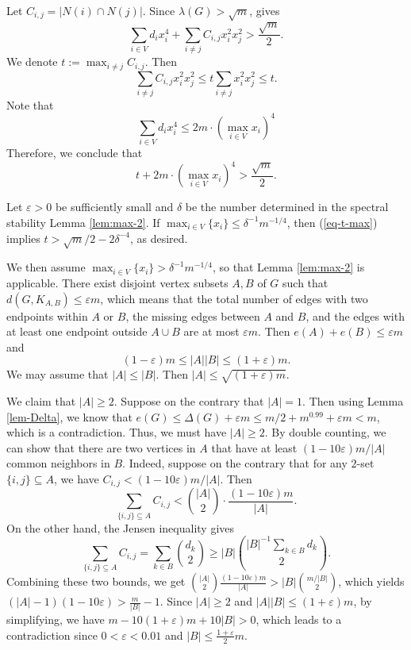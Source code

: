 \documentclass[11pt,a4paper]{article}
\theoremstyle{definition}
\theoremstyle{remark}
\begin{document}
Let $C_{i,j}=|N(i)\cap N(j)|$. Since $\lambda (G)> \sqrt{m}$,  gives 
    $$\sum_{i\in V} d_i x_i^4 + \sum_{i \neq j} C_{i, j} x_i^2 x_j^2 > \frac{\sqrt{m}}{2}.$$
    We denote $t := \max_{i \neq j} C_{i, j}$. Then 
    $$\sum_{i \neq j} C_{i, j} x_i^2 x_j^2 \leq t \sum_{i \neq j} x_i^2 x_j^2 \leq t.$$
    Note that 
    $$\sum_{i\in V} d_i x_i^4 \leq 2m \cdot (\max_{i\in V} x_i)^4$$
    Therefore, we conclude that 
    \begin{equation} \label{eq-t-max}
        t + 2m \cdot (\max_{i\in V} x_i)^4 > \frac{\sqrt{m}}{2}.
    \end{equation}
    
    Let $\varepsilon >0$ be sufficiently small and 
    $\delta $ be the number determined in 
    the spectral stability Lemma \ref{lem:max-2}. 
    If $\max_{i\in V} \{x_i\} \le \delta^{-1}m^{-1/4}$, 
    then (\ref{eq-t-max}) implies $t> \sqrt{m}/2 - 2\delta^{-4}$, as desired. 
    
    We then assume $\max_{i\in V} \{x_i\} > \delta^{-1} m^{-1/4} $, so that Lemma \ref{lem:max-2} is applicable. 
    There exist disjoint vertex subsets $A,B$ of $G$ such that 
    $d(G,K_{A,B})\le \varepsilon m$, which means that the total number of edges with two endpoints within $A$ or $B$, the missing edges between $A$ and $B$, and the edges with at least one endpoint outside $A\cup B$ are at most $\varepsilon m$. 
    Then $e(A)+e(B)\le \varepsilon m$ and 
    \[ (1- \varepsilon)m \le  |A||B|  \le (1+ \varepsilon )m. \]  
    We may assume that $|A|\le |B|$. 
    Then $|A| \le \sqrt{(1+\varepsilon)m}$. 

We claim that $ |A|\ge 2$. Suppose on the contrary that 
$|A|=1$. Then using Lemma \ref{lem-Delta}, we know that 
$ e(G)\le \Delta (G) + \varepsilon m \le m/2 + m^{0.99} + \varepsilon m <m$, which is a contradiction. 
 Thus, we must have $|A|\ge 2$. 
By double counting, we can show that 
    there are two vertices in $A$ that have at least ${(1- 10\varepsilon)m}/{|A|}$ common neighbors in $B$. 
Indeed, suppose on the contrary that 
for any $2$-set $\{i,j\} \subseteq A$, we have $C_{i,j}< {(1-10\varepsilon)m}/{|A|}$. Then 
\[ \sum_{\{i,j\} \subseteq A} C_{i,j} < {|A| \choose 2} \cdot \frac{(1-10\varepsilon)m}{|A|} .\]
On the other hand, the Jensen inequality gives  
\[ \sum_{\{i,j\}\subseteq A} C_{i,j} = \sum_{k\in B} {d_k \choose 2} \ge |B| {|B|^{-1} \sum_{k\in B}d_k \choose 2} .  \]
Combining these two bounds, we get 
${|A| \choose 2} \frac{(1-10\varepsilon)m}{|A|} > |B| {m/|B| \choose 2}$, which yields 
$(|A| -1) (1- 10\varepsilon) > \frac{m}{|B|}-1$. 
Since $|A| \ge 2$ and $|A||B| \le (1+\varepsilon)m$, 
by simplifying, we have $m-10(1+\varepsilon)m + 10 |B|>0$, which leads to a contradiction since $0<\varepsilon< 0.01$ and $|B|\le \frac{1+\varepsilon}{2}m$.  
\end{document}
